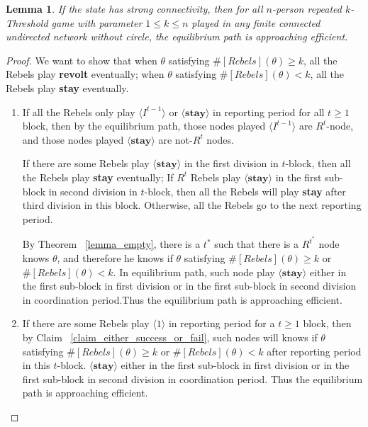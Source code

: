 \documentclass[12pt]{article}
\newtheorem{lemma}{Lemma}[subsection]
\theoremstyle{remark}
\theoremstyle{remark}
\begin{document}
\begin{lemma}
If the state has strong connectivity, then for all $n$-person repeated $k$-Threshold game with parameter $1\leq k\leq n$ played in any finite connected undirected network without circle, the equilibrium path is approaching efficient.
\end{lemma}

\begin{proof}
We want to show that when $\theta$ satisfying $\#[Rebels](\theta)\geq k$, all the Rebels play \textbf{revolt} eventually; when $\theta$ satisfying $\#[Rebels](\theta)< k$, all the Rebels play \textbf{stay} eventually.
\begin{enumerate}
\item If all the Rebels only play $\langle I^{t-1} \rangle$ or $\langle \textbf{stay} \rangle$ in reporting period for all $t\geq 1$ block, then by the equilibrium path, those nodes played $\langle I^{t-1} \rangle$ are $R^t$-node, and those nodes played $\langle \textbf{stay} \rangle$ are not-$R^t$ nodes. 

If there are some Rebels play $\langle \textbf{stay} \rangle$ in the first division in $t$-block, then all the Rebels play \textbf{stay} eventually; If $R^t$ Rebels play $\langle \textbf{stay} \rangle$ in the first sub-block in second division in $t$-block, then all the Rebels will play \textbf{stay} after third division in this block. Otherwise, all the Rebels go to the next reporting period.

By Theorem ~\ref{lemma_empty}, there is a $t^{*}$ such that there is a $R^{t^{*}}$ node knows $\theta$, and therefore he knows if $\theta$ satisfying $\#[Rebels](\theta)\geq k$ or $\#[Rebels](\theta)< k$. In equilibrium path, such node play $\langle \textbf{stay} \rangle$ either in the first sub-block in first division or in the first sub-block in second division in coordination period.Thus the equilibrium path is approaching efficient.

\item If there are some Rebels play $\langle 1 \rangle$ in reporting period for a $t\geq 1$ block, then by Claim ~\ref{claim_either_success_or_fail}, such nodes will knows if $\theta$ satisfying $\#[Rebels](\theta)\geq k$ or $\#[Rebels](\theta)< k$ after reporting period in this $t$-block. $\langle \textbf{stay} \rangle$ either in the first sub-block in first division or in the first sub-block in second division in coordination period. Thus the equilibrium path is approaching efficient.

 
\end{enumerate}

\end{proof}
\end{document}
